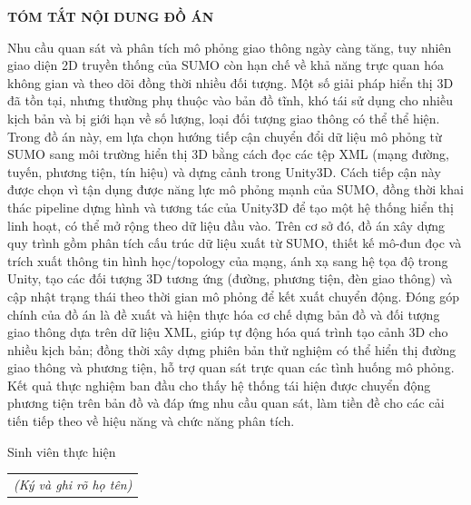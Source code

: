 \documentclass[../DoAn.tex]{subfiles}
\begin{document}
\begin{center}
    \Large{\textbf{TÓM TẮT NỘI DUNG ĐỒ ÁN}}\\
\end{center}
\vspace{1cm}

Nhu cầu quan sát và phân tích mô phỏng giao thông ngày càng tăng, tuy nhiên giao diện 2D truyền thống của SUMO còn hạn chế về khả năng trực quan hóa không gian và theo dõi đồng thời nhiều đối tượng. Một số giải pháp hiển thị 3D đã tồn tại, nhưng thường phụ thuộc vào bản đồ tĩnh, khó tái sử dụng cho nhiều kịch bản và bị giới hạn về số lượng, loại đối tượng giao thông có thể thể hiện. Trong đồ án này, em lựa chọn hướng tiếp cận chuyển đổi dữ liệu mô phỏng từ SUMO sang môi trường hiển thị 3D bằng cách đọc các tệp XML (mạng đường, tuyến, phương tiện, tín hiệu) và dựng cảnh trong Unity3D. Cách tiếp cận này được chọn vì tận dụng được năng lực mô phỏng mạnh của SUMO, đồng thời khai thác pipeline dựng hình và tương tác của Unity3D để tạo một hệ thống hiển thị linh hoạt, có thể mở rộng theo dữ liệu đầu vào. Trên cơ sở đó, đồ án xây dựng quy trình gồm phân tích cấu trúc dữ liệu xuất từ SUMO, thiết kế mô-đun đọc và trích xuất thông tin hình học/topology của mạng, ánh xạ sang hệ tọa độ trong Unity, tạo các đối tượng 3D tương ứng (đường, phương tiện, đèn giao thông) và cập nhật trạng thái theo thời gian mô phỏng để kết xuất chuyển động. Đóng góp chính của đồ án là đề xuất và hiện thực hóa cơ chế dựng bản đồ và đối tượng giao thông dựa trên dữ liệu XML, giúp tự động hóa quá trình tạo cảnh 3D cho nhiều kịch bản; đồng thời xây dựng phiên bản thử nghiệm có thể hiển thị đường giao thông và phương tiện, hỗ trợ quan sát trực quan các tình huống mô phỏng. Kết quả thực nghiệm ban đầu cho thấy hệ thống tái hiện được chuyển động phương tiện trên bản đồ và đáp ứng nhu cầu quan sát, làm tiền đề cho các cải tiến tiếp theo về hiệu năng và chức năng phân tích.

\begin{flushright}
Sinh viên thực hiện\\
\begin{tabular}{@{}c@{}}
\textit{(Ký và ghi rõ họ tên)}
\end{tabular}
\end{flushright}
\end{document}
